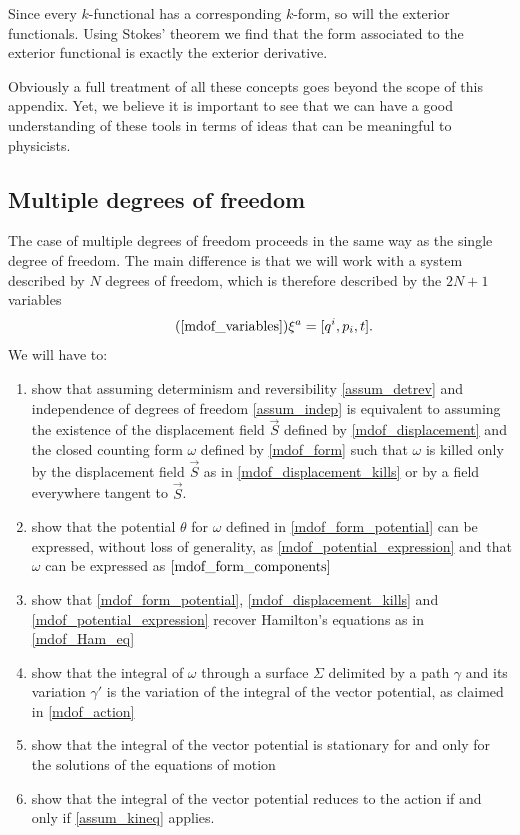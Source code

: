 \documentclass[fleqn,10pt]{wlscirep}
\begin{document}
Since every $k$-functional has a corresponding $k$-form, so will the exterior functionals. Using Stokes' theorem we find that the form associated to the exterior functional is exactly the exterior derivative.

Obviously a full treatment of all these concepts goes beyond the scope of this appendix. Yet, we believe it is important to see that we can have a good understanding of these tools in terms of ideas that can be meaningful to physicists. 

\fi

\subsection*{Multiple degrees of freedom}

The case of multiple degrees of freedom proceeds in the same way as the single degree of freedom. The main difference is that we will work with a system described by $N$ degrees of freedom, which is therefore described by the $2N+1$ variables
\begin{equation}
\tag*{(\ref{mdof_variables})}
	\xi^a = [ q^i, p_i, t].
\end{equation}
We will have to:
\begin{enumerate}[label=(\roman*)]
	\item show that assuming determinism and reversibility \ref{assum_detrev} and independence of degrees of freedom \ref{assum_indep} is equivalent to assuming the existence of the displacement field $\vec{S}$ defined by \ref{mdof_displacement} and the closed counting form $\omega$ defined by \ref{mdof_form} such that $\omega$ is killed only by the displacement field $\vec{S}$ as in \ref{mdof_displacement_kills} or by a field everywhere tangent to $\vec{S}$.
	\item show that the potential $\theta$ for $\omega$ defined in \ref{mdof_form_potential} can be expressed, without loss of generality, as \ref{mdof_potential_expression} and that $\omega$ can be expressed as $\ref{mdof_form_components}$
	\item show that \ref{mdof_form_potential}, \ref{mdof_displacement_kills} and \ref{mdof_potential_expression} recover Hamilton's equations as in \ref{mdof_Ham_eq}
	\item show that the integral of $\omega$ through a surface $\Sigma$ delimited by a path $\gamma$ and its variation $\gamma'$ is the variation of the integral of the vector potential, as claimed in \ref{mdof_action}
	\item show that the integral of the vector potential is stationary for and only for the solutions of the equations of motion
	\item show that the integral of the vector potential reduces to the action if and only if \ref{assum_kineq} applies.
\end{enumerate}
\end{document}
